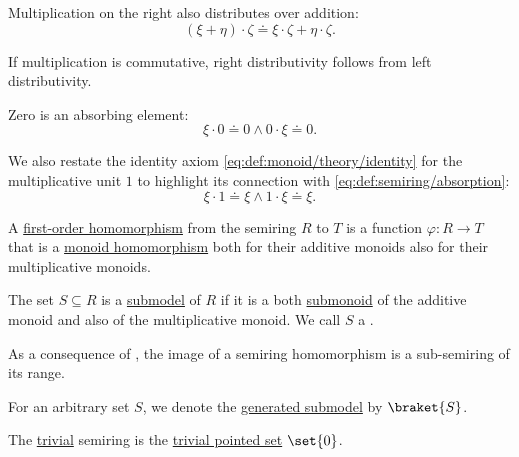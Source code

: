 \begin{definition}
\begin{thmenum}
\begin{thmenum}
       Multiplication on the right also distributes over addition:
      \begin{equation}\label{eq:def:semiring/right_distributivity}
        (\xi + \eta) \cdot \zeta \doteq \xi \cdot \zeta + \eta \cdot \zeta.
      \end{equation}

      If multiplication is commutative, right distributivity follows from left distributivity.

       Zero is an absorbing element:
      \begin{equation}\label{eq:def:semiring/absorption}
        \xi \cdot 0 \doteq 0 \wedge 0 \cdot \xi \doteq 0.
      \end{equation}

       We also restate the identity axiom \eqref{eq:def:monoid/theory/identity} for the multiplicative unit \( 1 \) to highlight its connection with \eqref{eq:def:semiring/absorption}:
      \begin{equation}\label{eq:def:semiring/identity}
        \xi \cdot 1 \doteq \xi \wedge 1 \cdot \xi \doteq \xi.
      \end{equation}
    \end{thmenum}

     A \hyperref[def:first_order_homomorphism]{first-order homomorphism} from the semiring \( R \) to \( T \) is a function \( \varphi: R \to T \) that is a \hyperref[def:monoid/homomorphism]{monoid homomorphism} both for their additive monoids also for their multiplicative monoids.

     The set \( S \subseteq R \) is a \hyperref[thm:substructure_is_model]{submodel} of \( R \) if it is a both \hyperref[def:monoid/submodel]{submonoid} of the additive monoid and also of the multiplicative monoid. We call \( S \) a .

    As a consequence of , the image of a semiring homomorphism is a sub-semiring of its range.

    For an arbitrary set \( S \), we denote the \hyperref[def:first_order_generated_substructure]{generated submodel} by \( \braket{ S } \).

     The \hyperref[thm:substructures_form_complete_lattice/bottom]{trivial} semiring is the \hyperref[def:pointed_set/trivial]{trivial pointed set} \( \set{ 0 } \).


\end{thmenum}
\end{definition}
